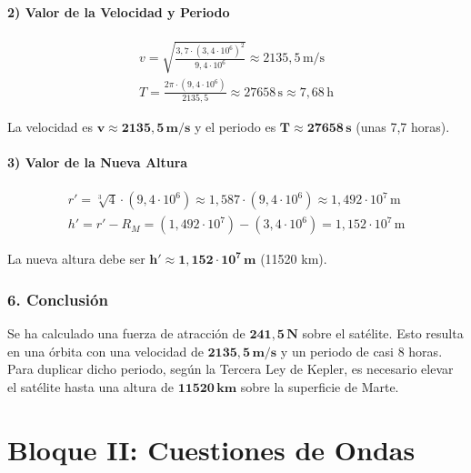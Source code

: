 \paragraph*{2) Valor de la Velocidad y Periodo}
\begin{gather}
    v = \sqrt{\frac{3,7 \cdot (3,4 \cdot 10^6)^2}{9,4 \cdot 10^6}} \approx 2135,5 \, \text{m/s} \\
    T = \frac{2\pi \cdot (9,4 \cdot 10^6)}{2135,5} \approx 27658 \, \text{s} \approx 7,68 \, \text{h}
\end{gather}
\begin{cajaresultado}
    La velocidad es $\boldsymbol{v \approx 2135,5 \, \textbf{m/s}}$ y el periodo es $\boldsymbol{T \approx 27658 \, \textbf{s}}$ (unas 7,7 horas).
\end{cajaresultado}

\paragraph*{3) Valor de la Nueva Altura}
\begin{gather}
    r' = \sqrt[3]{4} \cdot (9,4 \cdot 10^6) \approx 1,587 \cdot (9,4 \cdot 10^6) \approx 1,492 \cdot 10^7 \, \text{m} \\
    h' = r' - R_M = (1,492 \cdot 10^7) - (3,4 \cdot 10^6) = 1,152 \cdot 10^7 \, \text{m}
\end{gather}
\begin{cajaresultado}
    La nueva altura debe ser $\boldsymbol{h' \approx 1,152 \cdot 10^7 \, \textbf{m}}$ (11520 km).
\end{cajaresultado}

\subsubsection*{6. Conclusión}
\begin{cajaconclusion}
Se ha calculado una fuerza de atracción de $\mathbf{241,5 \, N}$ sobre el satélite. Esto resulta en una órbita con una velocidad de $\mathbf{2135,5 \, m/s}$ y un periodo de casi 8 horas. Para duplicar dicho periodo, según la Tercera Ley de Kepler, es necesario elevar el satélite hasta una altura de $\mathbf{11520 \, km}$ sobre la superficie de Marte.
\end{cajaconclusion}

\newpage

\section{Bloque II: Cuestiones de Ondas}
\label{sec:ondas_2002_jun_ord}

